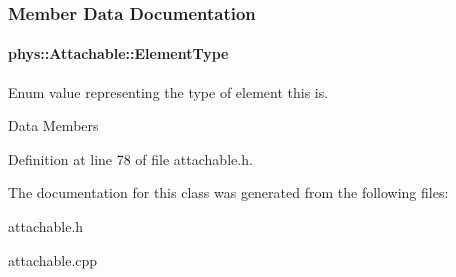 \subsubsection{Member Data Documentation}
\hypertarget{classphys_1_1Attachable_af574d5f08a304c6e0ae002bb2fc057c7}{
\paragraph[{ElementType}]{ {\bf phys::Attachable::ElementType}}\hfill}
\label{df/dbd/classphys_1_1Attachable_af574d5f08a304c6e0ae002bb2fc057c7}


Enum value representing the type of element this is. 

Data Members 

Definition at line 78 of file attachable.h.



The documentation for this class was generated from the following files:\begin{DoxyCompactItemize}
\item 
attachable.h\item 
attachable.cpp\end{DoxyCompactItemize}
